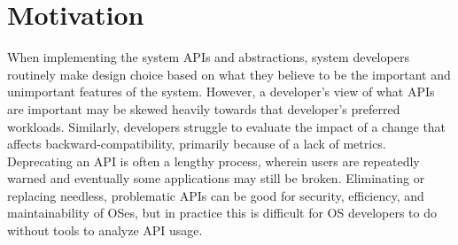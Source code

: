 


\section{Motivation}

When implementing the system APIs and abstractions,
system developers routinely make design choice based on
what they believe to be the important and unimportant features of the system.
However, a developer's view of what APIs are important
may be skewed heavily towards that developer's preferred workloads.
Similarly, developers struggle to evaluate the impact of a 
change that affects backward-compatibility,
primarily because of a lack of metrics.
Deprecating an API is often a lengthy process, wherein
users are repeatedly warned 
and eventually some applications may still be broken.
Eliminating or replacing needless, problematic APIs 
can be good for security, efficiency, and maintainability of OSes,
but in practice this is difficult for OS developers to do without tools to analyze API usage.

